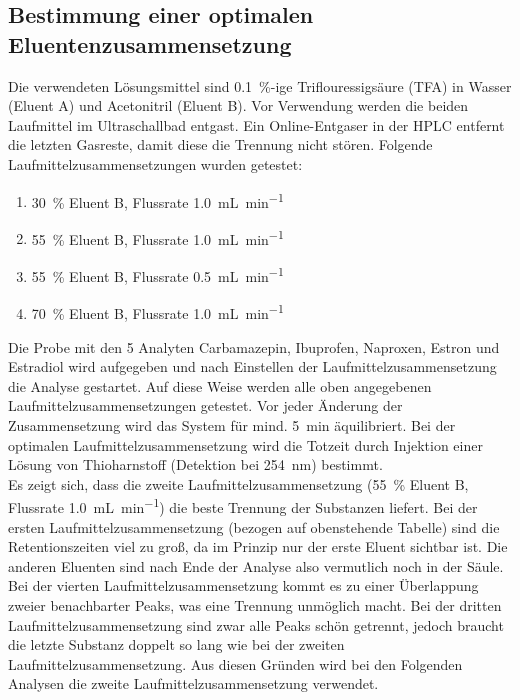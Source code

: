     
  \subsection{Bestimmung einer optimalen Eluentenzusammensetzung}
  
    Die verwendeten Lösungsmittel sind \SI[mode=text]{0.1}{\percent}-ige Triflouressigsäure (TFA) in Wasser (Eluent A) und Acetonitril (Eluent B). Vor Verwendung werden die beiden Laufmittel im Ultraschallbad entgast. Ein Online-Entgaser in der HPLC entfernt die letzten Gasreste, damit diese die Trennung nicht stören. Folgende Laufmittelzusammensetzungen wurden getestet:
    
      \begin{enumerate}
        \item \SI[mode=text]{30}{\percent} Eluent B, Flussrate \SI[mode=text]{1.0}{\milli\liter\per\minute}
        \item \SI[mode=text]{55}{\percent} Eluent B, Flussrate \SI[mode=text]{1.0}{\milli\liter\per\minute}
        \item \SI[mode=text]{55}{\percent} Eluent B, Flussrate \SI[mode=text]{0.5}{\milli\liter\per\minute}
        \item \SI[mode=text]{70}{\percent} Eluent B, Flussrate \SI[mode=text]{1.0}{\milli\liter\per\minute}
      \end{enumerate}
    Die Probe mit den 5 Analyten Carbamazepin, Ibuprofen, Naproxen, Estron und Estradiol wird aufgegeben und nach Einstellen der Laufmittelzusammensetzung die Analyse gestartet. Auf diese Weise werden alle oben angegebenen Laufmittelzusammensetzungen getestet. Vor jeder Änderung der Zusammensetzung wird das System für mind. \SI[mode=text]{5}{min} äquilibriert. Bei der optimalen Laufmittelzusammensetzung wird die Totzeit durch Injektion einer Lösung von Thioharnstoff (Detektion bei \SI[mode=text]{254}{\nano\meter}) bestimmt. \\
    
    Es zeigt sich, dass die zweite Laufmittelzusammensetzung (\SI[mode=text]{55}{\percent} Eluent B, Flussrate \SI[mode=text]{1.0}{\milli\liter\per\minute}) die beste Trennung der Substanzen liefert. Bei der ersten Laufmittelzusammensetzung (bezogen auf obenstehende Tabelle) sind die Retentionszeiten viel zu groß, da im Prinzip nur der erste Eluent sichtbar ist. Die anderen Eluenten sind nach Ende der Analyse also vermutlich noch in der Säule. Bei der vierten Laufmittelzusammensetzung kommt es zu einer Überlappung zweier benachbarter Peaks, was eine Trennung unmöglich macht. Bei der dritten Laufmittelzusammensetzung sind zwar alle Peaks schön getrennt, jedoch braucht die letzte Substanz doppelt so lang wie bei der zweiten Laufmittelzusammensetzung. Aus diesen Gründen wird bei den Folgenden Analysen die zweite Laufmittelzusammensetzung verwendet.
    
